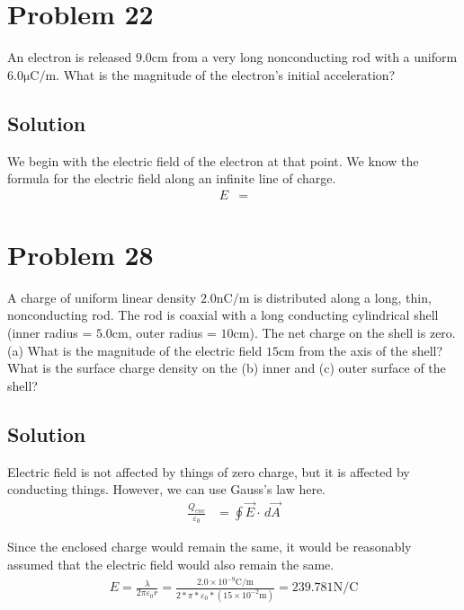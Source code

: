 \documentclass[12pt]{article}
\begin{document}
\section{Problem 22}
An electron is released $9.0 \unit{\centi\meter}$ from a very long nonconducting rod with a uniform $6.0 \unit{\micro\coulomb/\meter}$. What is the magnitude of the electron's initial acceleration?

\subsection*{Solution}
We begin with the electric field of the electron at that point. We know the formula for the electric field along an infinite line of charge.
\begin{align*}
    E   &=  
\end{align*}

\pagebreak
\section{Problem 28}
A charge of uniform linear density $2.0 \unit{\nano\coulomb/\meter}$ is distributed along a long, thin, nonconducting rod. The rod is coaxial with a long conducting cylindrical shell (inner radius = $5.0 \unit{\centi\meter}$, outer radius = $10 \unit{\centi\meter}$). The net charge on the shell is zero. (a) What is the magnitude of the electric field $15 \unit{\centi\meter}$ from the axis of the shell? What is the surface charge density on the (b) inner and (c) outer surface of the shell?

\subsection{Solution}
Electric field is not affected by things of zero charge, but it is affected by conducting things. However, we can use Gauss's law here.
\begin{align*}
    \frac{Q_{enc}}{\varepsilon_0}   &=  \oint \vec{E} \cdot \,d\vec{A}
\end{align*}

Since the enclosed charge would remain the same, it would be reasonably assumed that the electric field would also remain the same.
\begin{gather*}
    E   =   \frac{\lambda}{2\pi\varepsilon_0 r}
        =   \frac{2.0 \times 10^{-9} \unit{\coulomb/\meter}}{2*\pi*\varepsilon_0*(15 \times 10^{-2} \unit{\meter})}
        =   \boxed{239.781 \unit{\newton/\coulomb}}
\end{gather*}
\end{document}
